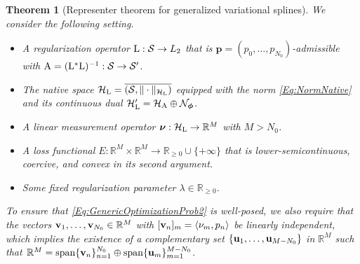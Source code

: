 \documentclass[11pt, english,english]{article}
\newtheorem{theorem}{Theorem}
\newcommand{\R}{ \mathbb{R}}
\newcommand{\Lop}{{\rm L}}
\def\V#1{{\boldsymbol{#1}}}         %
\def\Spc#1{{\mathcal{#1}}}  %
\def\M#1{{\bf{#1}}}  %
\def\Op#1{{\mathrm{#1}}}  %
\renewcommand{\[}{\begin{equation}}
\renewcommand{\]}[1]{\label{eq:#1}\end{equation}}
\begin{document}
\begin{theorem}[Representer theorem for generalized variational splines]
\label{Theo:GeneralRepSemiHilbert}
We consider the following setting.
\begin{itemize}
\item A regularization operator $\Lop: \Spc S \to L_2$ that is $\V p=(p_0,\dots,p_{N_0})$-admissible with $\Op A=(\Lop^\ast\Lop)^{-1}: \Spc S \to \Spc S'$.
\item The native space $\Spc H_\Lop=\overline{(\Spc S,\|\cdot\|_{\Spc H_\Lop})}$ equipped with the norm \eqref{Eq:NormNative} and its continuous dual $\Spc H_\Lop'=\Spc H_{\Op A} \oplus \Spc N_{\V \phi}$.
\item A linear measurement operator 
$\V \nu: \Spc H_\Lop \to \R^M$ with $M>N_0$. %

\item A  loss functional $E: \R^M \times \R^M \to \R_{\ge0}\cup \{+\infty\}$ that is lower-semicontinuous, coercive, 
and convex in its second argument.
\item Some fixed regularization parameter $\lambda \in \R_{\ge0}$. 
\end{itemize}
To ensure that \eqref{Eq:GenericOptimizationProb2} is well-posed, we also require that the vectors $\M v_1,\dots,\M v_{N_0} \in\R^M$ with 
$[\M v_n]_m=\langle \nu_m,p_n \rangle$ be {\em linearly independent}, which implies the existence of
a complementary set $\{\M u_1, \dots, \M u_{M-N_0}\}$ in $\R^M$ such that $\R^M={\rm span} \{\M v_n\}_{n=1}^{N_0}  \oplus {\rm span} \{\M u_m\}_{m=1}^{M-N_0}$.


\end{theorem}
\end{document}
